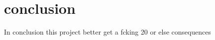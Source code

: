 \section{conclusion}
In conclusion \newline
this project better get a fcking 20 or else consequences
